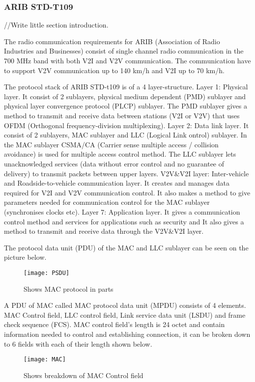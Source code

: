 \subsubsection{ARIB STD-T109}
% 
% 
//Write little section introduction.\par
% 
The radio communication requirements for ARIB (Association of Radio Industries and Businesses) consist of single channel radio communication in the 700 MHz band with both V2I and V2V communication. The communication have to support V2V communication up to 140 km/h and V2I up to 70 km/h.\par
% 
The protocol stack of ARIB STD-t109 is of a 4 layer-structure.
Layer 1: Physical layer. It consist of 2 sublayers, physical medium dependent (PMD) sublayer and physical layer convergence protocol (PLCP) sublayer. The PMD sublayer gives a method to transmit and receive data between stations (V2I or V2V) that uses OFDM (Orthogonal frequency-division multiplexing).
Layer 2: Data link layer. It consist of 2 sublayers, MAC sublayer and LLC (Logical Link ontrol) sublayer. In the MAC sublayer CSMA/CA (Carrier sense multiple access / collision avoidance) is used for multiple access control method. The LLC sublayer lets unacknowledged services (data without error control and no guarantee of delivery) to transmit packets between upper layers.
V2V\&V2I layer: Inter-vehicle and Roadside-to-vehicle communication layer. It creates and manages data required for V2I and V2V communication control. It also makes a method to give parameters needed for communication control for the MAC sublayer (synchronises clocks etc).
Layer 7: Application layer. It gives a communication control method and services for applications such as security and It also gives a method to transmit and receive data through the V2V\&V2I layer. 
\par
The protocol data unit (PDU) of the MAC and LLC sublayer can be seen on the picture below.
\begin{figure}[h]
    \centering
    \texttt{[image: PSDU]}
    \caption{Shows MAC protocol in parts}
    \label{fig:PSDU}
\end{figure}

A PDU of MAC called MAC protocol data unit (MPDU) consists of 4 elements. MAC Control field, LLC control field, Link service data unit (LSDU) and frame check sequence (FCS).
MAC control field's length is 24 octet and contain information needed to control and  establishing connection, it can be broken down to 6 fields with each of their length shown below.
\begin{figure}[h]
    \centering
    \texttt{[image: MAC]}
    \caption{Shows breakdown of MAC Control field}
    \label{fig:MAC}
\end{figure}


